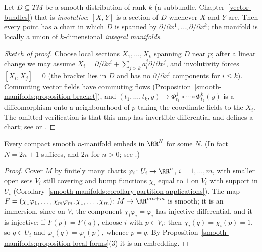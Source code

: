 \begin{theorem}[Frobenius]\label{smooth-manifolds:theorem-frobenius}
Let $D \subseteq TM$ be a smooth distribution of rank $k$ (a subbundle, Chapter~\ref{vector-bundles}) that is \emph{involutive}: $[X, Y]$ is a section of $D$ whenever $X$ and $Y$ are. Then every point has a
chart in which $D$ is spanned by $\partial/\partial x^1, \ldots, \partial/\partial x^k$; the manifold is locally a union of $k$-dimensional \emph{integral manifolds}.
\end{theorem}

\begin{proof}[Sketch of proof]
Choose local sections $X_1, \ldots, X_k$ spanning $D$ near $p$; after a linear change we may assume $X_i = \partial/\partial x^i + \sum_{j > k}a^j_i\partial/\partial x^j$, and involutivity forces $[X_i, X_j] = 0$ (the
bracket lies in $D$ and has no $\partial/\partial x^i$ components for $i \leq k$). Commuting vector fields have commuting flows (Proposition~\ref{smooth-manifolds:proposition-bracket}), and
$(t_1, \ldots, t_k, y) \mapsto \Phi^1_{t_1} \circ \cdots \circ \Phi^k_{t_k}(y)$ is a diffeomorphism onto a neighbourhood of $p$ taking the coordinate fields to the $X_i$. The omitted verification is that
this map has invertible differential and defines a chart; see \cite[Chapter 19]{lee-smooth-manifolds} or \cite[Chapter 1]{warner-foundations}.
\end{proof}

\begin{theorem}\label{smooth-manifolds:theorem-whitney}
Every compact smooth $n$-manifold embeds in $\RR^N$ for some $N$. (In fact $N = 2n + 1$ suffices, and $2n$ for $n > 0$; see \cite[Chapter 1]{hirsch-differential-topology}.)
\end{theorem}

\begin{proof}
Cover $M$ by finitely many charts $\varphi_i \colon U_i \to \RR^n$, $i = 1, \ldots, m$, with smaller open sets $V_i$ still covering and bump functions $\chi_i$ equal to $1$ on $\overline{V_i}$ with support in $U_i$
(Corollary~\ref{smooth-manifolds:corollary-partition-applications}). The map $F = (\chi_1\varphi_1, \ldots, \chi_m\varphi_m, \chi_1, \ldots, \chi_m) \colon M \to \RR^{mn + m}$ is smooth; it is an immersion,
since on $V_i$ the component $\chi_i\varphi_i = \varphi_i$ has injective differential, and it is injective: if $F(p) = F(q)$, choose $i$ with $p \in V_i$; then $\chi_i(q) = \chi_i(p) = 1$, so $q \in U_i$ and
$\varphi_i(q) = \varphi_i(p)$, whence $p = q$. By Proposition~\ref{smooth-manifolds:proposition-local-forms}(3) it is an embedding.
\end{proof}

